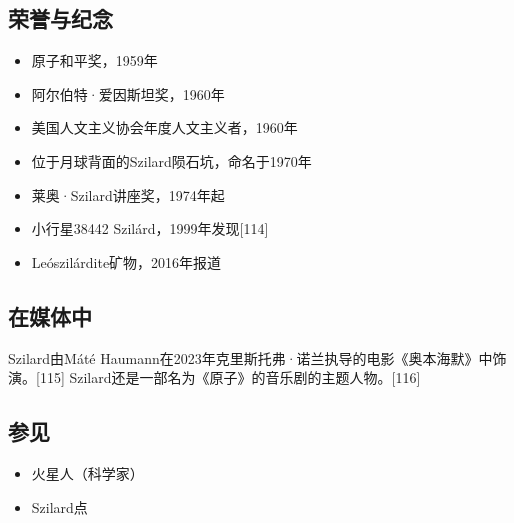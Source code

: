 \subsection{荣誉与纪念}  
\begin{itemize}
\item 原子和平奖，1959年  
\item 阿尔伯特·爱因斯坦奖，1960年  
\item 美国人文主义协会年度人文主义者，1960年  
\item 位于月球背面的Szilard陨石坑，命名于1970年  
\item 莱奥·Szilard讲座奖，1974年起  
\item 小行星38442 Szilárd，1999年发现[114]  
\item Leószilárdite矿物，2016年报道
\end{itemize}
\subsection{在媒体中}  
Szilard由Máté Haumann在2023年克里斯托弗·诺兰执导的电影《奥本海默》中饰演。[115] Szilard还是一部名为《原子》的音乐剧的主题人物。[116]
\subsection{参见}  
\begin{itemize}
\item 火星人（科学家）  
\item Szilard点
\end{itemize}
